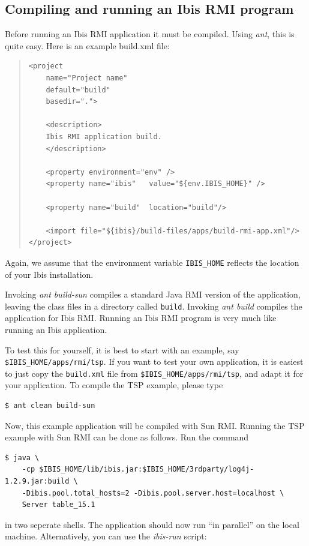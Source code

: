 \documentclass[10pt]{article}
\newcommand{\mysubsection}[1]{\subsection{#1}\label{#1}}
\begin{document}
\mysubsection{Compiling and running an Ibis RMI program}

Before running an Ibis RMI application it must be compiled.
Using \emph{ant}, this is quite easy. Here is an example build.xml file:

{\small
\begin{quote}
\begin{verbatim}
<project
    name="Project name"
    default="build"
    basedir=".">

    <description>
    Ibis RMI application build.
    </description>

    <property environment="env" />
    <property name="ibis"   value="${env.IBIS_HOME}" />

    <property name="build"  location="build"/>

    <import file="${ibis}/build-files/apps/build-rmi-app.xml"/>
</project>
\end{verbatim}
\end{quote}
}

Again, we assume that the environment variable \texttt{IBIS\_HOME} reflects
the location of your Ibis installation.

Invoking \emph{ant build-sun} compiles a standard Java RMI version of
the application, leaving the class files in a directory called \texttt{build}.
Invoking \emph{ant build} compiles the application for Ibis RMI.
Running an Ibis RMI program is very much like running an Ibis application.

To test this for yourself, it is best to start with
an example, say \texttt{\$IBIS\_HOME/apps/rmi/tsp}. 
If you want to test your own application, it is easiest to just copy
the \texttt{build.xml} file from \texttt{\$IBIS\_HOME/apps/rmi/tsp}, and adapt it for your
application. 
To compile the TSP example, please type

\noindent
{\small
\begin{verbatim}
$ ant clean build-sun
\end{verbatim}
}
\noindent
Now, this example application will be compiled with Sun RMI.
Running the TSP example with Sun RMI can be done as follows. Run the command

\noindent
{\small
\begin{verbatim}
$ java \
    -cp $IBIS_HOME/lib/ibis.jar:$IBIS_HOME/3rdparty/log4j-1.2.9.jar:build \
    -Dibis.pool.total_hosts=2 -Dibis.pool.server.host=localhost \
    Server table_15.1
\end{verbatim}
}
\noindent
in two seperate shells. The application should now run ``in parallel''
on the local machine. Alternatively, you can use the \emph{ibis-run} script:
\end{document}
